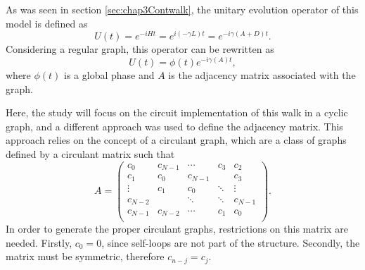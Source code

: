 \documentclass[../../dissertation.tex]{subfiles}
\begin{document}
As was seen in section \ref{sec:chap3Contwalk}, the unitary evolution operator
of this model is defined as
\begin{equation}
        U(t) = e^{-iHt} = e^{i(-\gamma L)t} = e^{-i\gamma(A+D)t}.
\end{equation}
Considering a regular graph, this operator can be rewritten as 
\begin{equation}
	U(t) = \phi(t) e^{-i\gamma(A)t},
\end{equation}
where $\phi(t)$ is a global phase and $A$ is the adjacency matrix associated
with the graph.\par

Here, the study will focus on the circuit implementation of this walk in a
cyclic graph, and a different approach was used to define the adjacency matrix.
This approach relies on the concept of a circulant graph, which are a class of
graphs defined by a circulant matrix such that
\begin{equation}
A = 
	\begin{pmatrix}
		c_0&c_{N-1}& \cdots&c_3&c_2 \\
		c_1&c_0& c_{N-1}& &c_{3} \\
		\vdots & c_1 & c_0 &\ddots & \vdots\\
		c_{N-2}& & \ddots&\ddots &c_{N-1}\\
		c_{N-1} & c_{N-2} & \cdots & c_1 & c_0\\
	\end{pmatrix}.
\label{eq:adjCirculant}
\end{equation}
In order to generate the proper circulant graphs, restrictions on this matrix
are needed. Firstly, $c_0=0$, since self-loops are not part of the structure.
Secondly, the matrix must be symmetric, therefore $c_{n-j} = c_j$.\par
\end{document}
